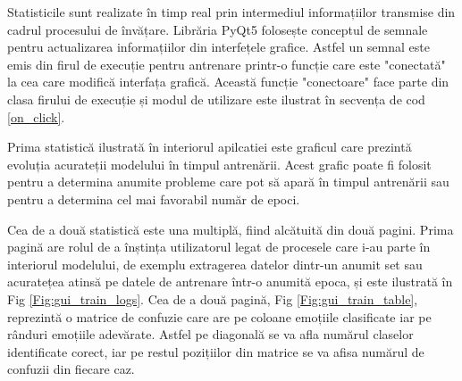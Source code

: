 \documentclass[a4paper,12pt]{book}
\begin{document}
		Statisticile sunt realizate în timp real prin intermediul informațiilor transmise din cadrul procesului de învățare. Librăria PyQt5 folosește conceptul de semnale pentru actualizarea informațiilor din interfețele grafice. Astfel un semnal este emis din firul de execuție pentru antrenare printr-o funcție care este "conectată" la cea care modifică interfața grafică. Această funcție "conectoare" face parte din clasa firului de execuție și modul de utilizare este ilustrat în 
		secvența de cod \ref{on_click}. \par
		Prima statistică ilustrată în interiorul apilcatiei este graficul care prezintă evoluția acurateții modelului în timpul antrenării. Acest grafic poate fi folosit pentru a determina anumite probleme care pot să apară în timpul antrenării sau pentru a determina cel mai favorabil număr de epoci. \par
		Cea de a două statistică este una multiplă, fiind alcătuită din două pagini. Prima pagină are rolul de a înștința utilizatorul legat de procesele care i-au parte în interiorul modelului, de exemplu extragerea datelor dintr-un anumit set sau acuratețea atinsă pe datele de antrenare într-o anumită epoca, și este ilustrată în Fig \ref{Fig:gui_train_logs}. Cea de a două pagină, Fig \ref{Fig:gui_train_table}, reprezintă o matrice de confuzie care are pe coloane emoțiile clasificate iar pe rânduri emoțiile adevărate. Astfel pe diagonală se va afla numărul claselor identificate corect, iar pe restul pozițiilor din matrice se va afisa numărul de confuzii din fiecare caz. 
\end{document}
